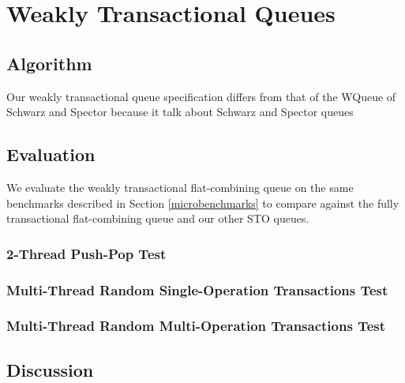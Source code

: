\chapter{Weakly Transactional Queues}
\label{wqueue}
%

\section{Algorithm}

Our weakly transactional queue specification differs from that of the WQueue of Schwarz and Spector\cite{schwarz} because it 
talk about Schwarz and Spector queues

\section{Evaluation}

We evaluate the weakly transactional flat-combining queue on the same benchmarks described in Section \ref{microbenchmarks} to compare against the fully transactional flat-combining queue and our other STO queues.

\subsection{2-Thread Push-Pop Test}

\subsection{Multi-Thread Random Single-Operation Transactions Test}

\subsection{Multi-Thread Random Multi-Operation Transactions Test}

\section{Discussion}
